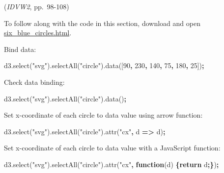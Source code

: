 \documentclass[openany]{book}
\newenvironment{Shaded}{\begin{snugshade}}{\end{snugshade}}
\newcommand{\AttributeTok}[1]{\textcolor[rgb]{0.77,0.63,0.00}{#1}}
\newcommand{\ControlFlowTok}[1]{\textcolor[rgb]{0.13,0.29,0.53}{\textbf{#1}}}
\newcommand{\DecValTok}[1]{\textcolor[rgb]{0.00,0.00,0.81}{#1}}
\newcommand{\KeywordTok}[1]{\textcolor[rgb]{0.13,0.29,0.53}{\textbf{#1}}}
\newcommand{\NormalTok}[1]{#1}
\newcommand{\OperatorTok}[1]{\textcolor[rgb]{0.81,0.36,0.00}{\textbf{#1}}}
\newcommand{\StringTok}[1]{\textcolor[rgb]{0.31,0.60,0.02}{#1}}
\newcommand{\VariableTok}[1]{\textcolor[rgb]{0.00,0.00,0.00}{#1}}
\begin{document}
(\emph{IDVW2}, pp.~98-108)

To follow along with the code in this section, download and open \href{https://raw.githubusercontent.com/jtr13/d3book/master/code/six_blue_circles.html}{six\_blue\_circles.html}.

Bind data:

\begin{Shaded}
\begin{Highlighting}[]
\VariableTok{d3}\NormalTok{.}\AttributeTok{select}\NormalTok{(}\StringTok{"svg"}\NormalTok{).}\AttributeTok{selectAll}\NormalTok{(}\StringTok{"circle"}\NormalTok{).}\AttributeTok{data}\NormalTok{([}\DecValTok{90}\OperatorTok{,} \DecValTok{230}\OperatorTok{,} \DecValTok{140}\OperatorTok{,} \DecValTok{75}\OperatorTok{,} \DecValTok{180}\OperatorTok{,} \DecValTok{25}\NormalTok{])}\OperatorTok{;}
\end{Highlighting}
\end{Shaded}

Check data binding:

\begin{Shaded}
\begin{Highlighting}[]
\VariableTok{d3}\NormalTok{.}\AttributeTok{select}\NormalTok{(}\StringTok{"svg"}\NormalTok{).}\AttributeTok{selectAll}\NormalTok{(}\StringTok{"circle"}\NormalTok{).}\AttributeTok{data}\NormalTok{()}\OperatorTok{;}
\end{Highlighting}
\end{Shaded}

Set x-coordinate of each circle to data value using arrow function:

\begin{Shaded}
\begin{Highlighting}[]
\VariableTok{d3}\NormalTok{.}\AttributeTok{select}\NormalTok{(}\StringTok{"svg"}\NormalTok{).}\AttributeTok{selectAll}\NormalTok{(}\StringTok{"circle"}\NormalTok{).}\AttributeTok{attr}\NormalTok{(}\StringTok{"cx"}\OperatorTok{,}\NormalTok{ d }\OperatorTok{=>}\NormalTok{ d)}\OperatorTok{;}
\end{Highlighting}
\end{Shaded}

Set x-coordinate of each circle to data value with a JavaScript function:

\begin{Shaded}
\begin{Highlighting}[]
\VariableTok{d3}\NormalTok{.}\AttributeTok{select}\NormalTok{(}\StringTok{"svg"}\NormalTok{).}\AttributeTok{selectAll}\NormalTok{(}\StringTok{"circle"}\NormalTok{).}\AttributeTok{attr}\NormalTok{(}\StringTok{"cx"}\OperatorTok{,} \KeywordTok{function}\NormalTok{(d) }\OperatorTok{\{}\ControlFlowTok{return}\NormalTok{ d}\OperatorTok{;\}}\NormalTok{)}\OperatorTok{;}
\end{Highlighting}
\end{Shaded}
\end{document}
